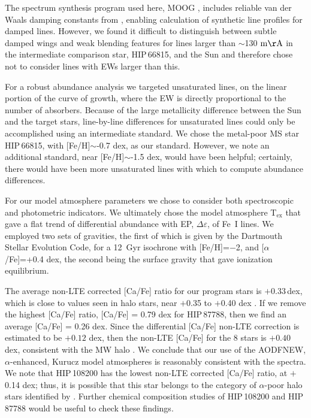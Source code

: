 \documentclass[revtex4]{emulateapj}
\begin{document}
The spectrum synthesis program used here, MOOG \citep{Sned1973}, includes reliable van der Waals damping constants from \citet{Bark2000}, enabling calculation of synthetic line profiles for damped lines.  However, we found it difficult to distinguish between subtle damped wings and weak blending features for lines larger than $\sim$130 $\mathrm{m\AA}$  in the intermediate comparison star, HIP\,66815, and the Sun and therefore chose not to consider lines with EWs larger than this. 

For a robust abundance analysis we targeted unsaturated lines, on the linear portion of the curve of growth, where the EW is directly proportional to the number of absorbers.  Because of the large metallicity difference between the Sun and the target stars, line-by-line differences for unsaturated lines could only be accomplished using an intermediate standard.  We chose the metal-poor MS star HIP\,66815, with [Fe/H]$\sim$-0.7 dex, as our standard.  However, we note an additional standard, near [Fe/H]$\sim$-1.5 dex, would have been helpful; certainly, there would have been more unsaturated lines with which to compute abundance differences.

For our model atmosphere parameters we chose to consider both spectroscopic and  photometric indicators.  We ultimately chose the model atmosphere T$_{\mathrm{ex}}$ that gave a flat trend of differential abundance with EP, $\Delta\varepsilon$, of Fe~I lines.  We  employed two sets of gravities, the first of which is given by the Dartmouth Stellar Evolution Code, for a 12~Gyr isochrone with [Fe/H]=$-$2, and [$\alpha$/Fe]=+0.4 dex, the second being the surface gravity that gave ionization equilibrium.  

The average non-LTE corrected [Ca/Fe] ratio for our program stars is $+$0.33\,dex, which is close to values seen in halo stars, near $+$0.35 to $+$0.40 dex \citep[e.g.][]{McW97,Cohen04}.  If we remove the highest [Ca/Fe] ratio, [Ca/Fe] = 0.79 dex for HIP\,87788, then we find an average [Ca/Fe] = 0.26 dex.  Since the differential [Ca/Fe] non-LTE correction is estimated to be $+0.12$ dex, then the non-LTE [Ca/Fe] for the 8 stars is $+0.40$ dex, consistent with the MW halo \cite[and references therein]{Sneden2004}.  We conclude that our use of the AODFNEW, $\alpha$-enhanced, Kurucz model atmospheres is reasonably consistent with the spectra.  We note that HIP\,108200 has the lowest non-LTE corrected [Ca/Fe] ratio, at $+$0.14 dex; thus, it is possible that this star belongs to the category of $\alpha$-poor halo stars identified by \citet{NS97,NS10}.  Further chemical composition studies of HIP\,108200 and HIP\,87788 would be useful to check these findings.
\end{document}
